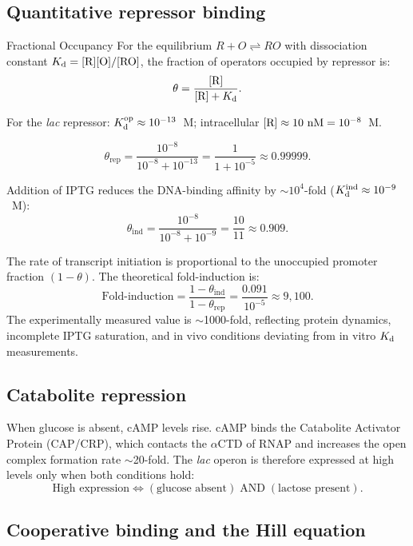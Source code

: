 \documentclass[12pt, a4paper, oneside]{report}
\begin{document}
\subsection{Quantitative repressor binding}

\begin{definition}{Fractional Occupancy}
  For the equilibrium $R + O \rightleftharpoons RO$ with dissociation
  constant $K_{\mathrm{d}} = [\mathrm{R}][\mathrm{O}]/[\mathrm{RO}]$, the fraction of operators
  occupied by repressor is:
  \[
    \theta = \frac{[\mathrm{R}]}{[\mathrm{R}] + K_{\mathrm{d}}}.
  \]
\end{definition}

For the \textit{lac} repressor: $K_{\mathrm{d}}^\text{op} \approx 10^{-13}$~M;
intracellular $[\mathrm{R}] \approx 10~\text{nM} = 10^{-8}$~M.

\[
  \theta_\text{rep} = \frac{10^{-8}}{10^{-8} + 10^{-13}}
                    = \frac{1}{1 + 10^{-5}} \approx 0.99999.
\]

Addition of IPTG reduces the DNA-binding affinity by $\sim10^4$-fold
($K_{\mathrm{d}}^\text{ind} \approx 10^{-9}$~M):
\[
  \theta_\text{ind} = \frac{10^{-8}}{10^{-8} + 10^{-9}}
                    = \frac{10}{11} \approx 0.909.
\]

The rate of transcript initiation is proportional to the unoccupied
promoter fraction $(1-\theta)$. The theoretical fold-induction is:
\[
  \text{Fold-induction} = \frac{1 - \theta_\text{ind}}{1 - \theta_\text{rep}}
  = \frac{0.091}{10^{-5}} \approx 9{,}100.
\]
The experimentally measured value is $\sim$1000-fold, reflecting protein
dynamics, incomplete IPTG saturation, and in vivo conditions deviating
from in vitro $K_{\mathrm{d}}$ measurements.

\subsection{Catabolite repression}

When glucose is absent, cAMP levels rise. cAMP binds the Catabolite
Activator Protein (CAP/CRP), which contacts the $\alpha$CTD of RNAP and
increases the open complex formation rate $\sim$20-fold.
The \textit{lac} operon is therefore expressed at high levels only when
both conditions hold:
\[
  \text{High expression} \Longleftrightarrow
  (\text{glucose absent}) \;\text{AND}\; (\text{lactose present}).
\]

\subsection{Cooperative binding and the Hill equation}
\end{document}
